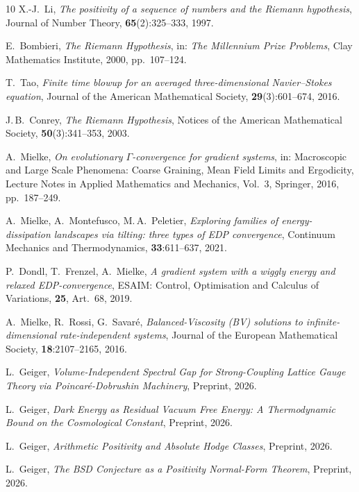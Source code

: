 \documentclass[12pt,a4paper]{article}
\theoremstyle{definition}
\theoremstyle{remark}
\begin{document}
\begin{thebibliography}{10}
X.-J.~Li,
\emph{The positivity of a sequence of numbers and the Riemann hypothesis},
Journal of Number Theory, \textbf{65}(2):325--333, 1997.

E.~Bombieri,
\emph{The Riemann Hypothesis},
in: \emph{The Millennium Prize Problems}, Clay Mathematics Institute, 2000, pp.~107--124.

T.~Tao,
\emph{Finite time blowup for an averaged three-dimensional Navier--Stokes equation},
Journal of the American Mathematical Society, \textbf{29}(3):601--674, 2016.

J.\,B.~Conrey,
\emph{The Riemann Hypothesis},
Notices of the American Mathematical Society, \textbf{50}(3):341--353, 2003.

A.~Mielke,
\emph{On evolutionary $\Gamma$-convergence for gradient systems},
in: Macroscopic and Large Scale Phenomena: Coarse Graining, Mean Field Limits and Ergodicity,
Lecture Notes in Applied Mathematics and Mechanics, Vol.~3, Springer, 2016, pp.~187--249.

A.~Mielke, A.~Montefusco, M.\,A.~Peletier,
\emph{Exploring families of energy-dissipation landscapes via tilting: three types of EDP convergence},
Continuum Mechanics and Thermodynamics, \textbf{33}:611--637, 2021.

P.~Dondl, T.~Frenzel, A.~Mielke,
\emph{A gradient system with a wiggly energy and relaxed EDP-convergence},
ESAIM: Control, Optimisation and Calculus of Variations, \textbf{25}, Art.~68, 2019.

A.~Mielke, R.~Rossi, G.~Savar\'e,
\emph{Balanced-Viscosity (BV) solutions to infinite-dimensional rate-independent systems},
Journal of the European Mathematical Society, \textbf{18}:2107--2165, 2016.

L.~Geiger, \textit{Volume-Independent Spectral Gap for Strong-Coupling Lattice Gauge Theory via Poincar\'e-Dobrushin Machinery}, Preprint, 2026.

L.~Geiger, \textit{Dark Energy as Residual Vacuum Free Energy: A Thermodynamic Bound on the Cosmological Constant}, Preprint, 2026.

L.~Geiger, \textit{Arithmetic Positivity and Absolute Hodge Classes}, Preprint, 2026.

L.~Geiger, \textit{The BSD Conjecture as a Positivity Normal-Form Theorem}, Preprint, 2026.


\end{thebibliography}
\end{document}
